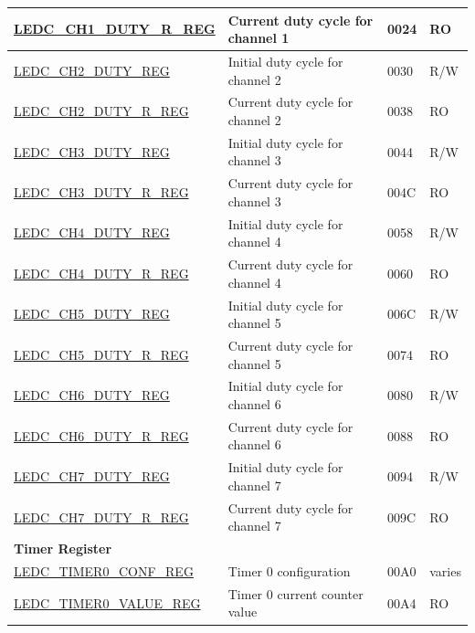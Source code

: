\begin{longtable}{ | p{6cm} | p{7.2cm} | p{1.3cm} | p{1cm} | }
\hyperref[regdesc:LEDCCHNDUTYRREG]{LEDC\_CH1\_DUTY\_R\_REG} & Current duty cycle for channel 1 & \hexprefix{}0024 & RO \\ \hline
\hyperref[regdesc:LEDCCHNDUTYREG]{LEDC\_CH2\_DUTY\_REG} & Initial duty cycle for channel 2 & \hexprefix{}0030 & R/W \\ \hline
\hyperref[regdesc:LEDCCHNDUTYRREG]{LEDC\_CH2\_DUTY\_R\_REG} & Current duty cycle for channel 2 & \hexprefix{}0038 & RO \\ \hline
\hyperref[regdesc:LEDCCHNDUTYREG]{LEDC\_CH3\_DUTY\_REG} & Initial duty cycle for channel 3 & \hexprefix{}0044 & R/W \\ \hline
\hyperref[regdesc:LEDCCHNDUTYRREG]{LEDC\_CH3\_DUTY\_R\_REG} & Current duty cycle for channel 3 & \hexprefix{}004C & RO \\ \hline
\hyperref[regdesc:LEDCCHNDUTYREG]{LEDC\_CH4\_DUTY\_REG} & Initial duty cycle for channel 4 & \hexprefix{}0058 & R/W \\ \hline
\hyperref[regdesc:LEDCCHNDUTYRREG]{LEDC\_CH4\_DUTY\_R\_REG} & Current duty cycle for channel 4 & \hexprefix{}0060 & RO \\ \hline
\hyperref[regdesc:LEDCCHNDUTYREG]{LEDC\_CH5\_DUTY\_REG} & Initial duty cycle for channel 5 & \hexprefix{}006C & R/W \\ \hline
\hyperref[regdesc:LEDCCHNDUTYRREG]{LEDC\_CH5\_DUTY\_R\_REG} & Current duty cycle for channel 5 & \hexprefix{}0074 & RO \\ \hline
\hyperref[regdesc:LEDCCHNDUTYREG]{LEDC\_CH6\_DUTY\_REG} & Initial duty cycle for channel 6 & \hexprefix{}0080 & R/W \\ \hline
\hyperref[regdesc:LEDCCHNDUTYRREG]{LEDC\_CH6\_DUTY\_R\_REG} & Current duty cycle for channel 6 & \hexprefix{}0088 & RO \\ \hline
\hyperref[regdesc:LEDCCHNDUTYREG]{LEDC\_CH7\_DUTY\_REG} & Initial duty cycle for channel 7 & \hexprefix{}0094 & R/W \\ \hline
\hyperref[regdesc:LEDCCHNDUTYRREG]{LEDC\_CH7\_DUTY\_R\_REG} & Current duty cycle for channel 7 & \hexprefix{}009C & RO \\ \hline
\multicolumn{4}{|l|}{\textbf{Timer Register}} \\ \hline
\hyperref[regdesc:LEDCTIMERXCONFREG]{LEDC\_TIMER0\_CONF\_REG} & Timer 0 configuration & \hexprefix{}00A0 & varies \\ \hline
\hyperref[regdesc:LEDCTIMERXVALUEREG]{LEDC\_TIMER0\_VALUE\_REG} & Timer 0 current counter value & \hexprefix{}00A4 & RO \\ \hline

\end{longtable}

